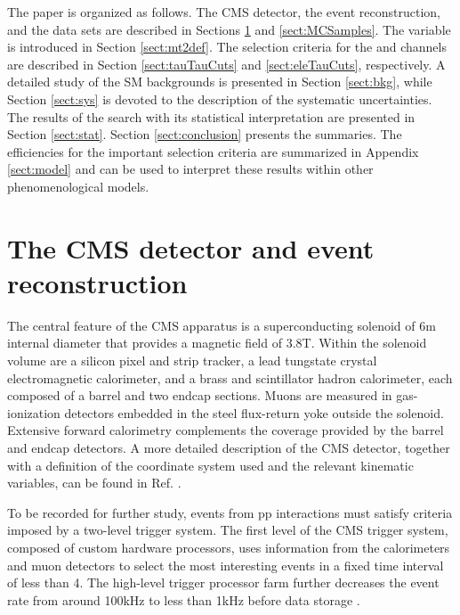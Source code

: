 The paper is organized as follows.  The CMS detector, the event reconstruction, and the data sets are described
in Sections \ref{sect:CMSRec} and \ref{sect:MCSamples}. The \mttwo variable is introduced in Section \ref{sect:mt2def}.
The selection criteria for the \tauTau and \leptonTau channels are described in Section \ref{sect:tauTauCuts} and \ref{sect:eleTauCuts}, respectively.
A detailed study of the SM backgrounds is presented in Section \ref{sect:bkg}, while Section \ref{sect:sys}
is devoted to the description of the systematic uncertainties.  The results of the search with its statistical interpretation are presented in
Section \ref{sect:stat}. Section \ref{sect:conclusion} presents the summaries. The efficiencies for the important selection criteria are summarized in Appendix \ref{sect:model} and can be used to interpret these results within other phenomenological models.




\section{The CMS detector and event reconstruction}
\label{sect:CMSRec}
The central feature of the CMS apparatus is a superconducting solenoid of 6\unit{m}
internal diameter that provides a magnetic field of 3.8\unit{T}. Within the solenoid
volume are a silicon pixel and strip tracker, a lead tungstate crystal electromagnetic
calorimeter, and a brass and scintillator hadron calorimeter, each composed of a barrel
and two endcap sections. Muons are measured in gas-ionization detectors embedded in the
steel flux-return yoke outside the solenoid. Extensive forward calorimetry complements the coverage provided by the barrel and endcap detectors.
A more detailed description of the CMS detector, together with a definition of the coordinate system used
and the relevant kinematic variables, can be found in Ref. \cite{Chatrchyan:2008zzk}.

To be recorded for further study, events from pp interactions must satisfy criteria imposed by a two-level trigger system.
The first level of the CMS trigger system, composed of custom hardware processors, uses information from the
calorimeters and muon detectors to select the most interesting events in a fixed time interval of less than 4\mus.
The high-level trigger processor farm further decreases the event rate from around 100\unit{kHz} to less than 1\unit{kHz}
before data storage \cite{Khachatryan:2016bia}.

